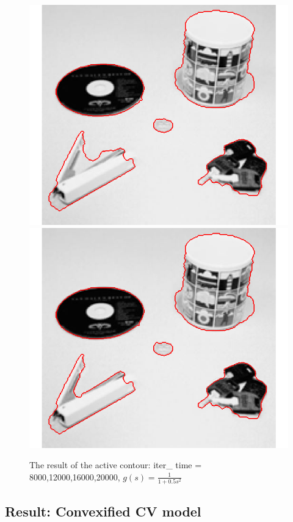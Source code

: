 \documentclass{article}
\begin{document}
\begin{figure}[H]
\begin{center}
\includegraphics[scale=.47]{ac_2.png}
\includegraphics[scale=.47]{ac_3.png}
\end{center}
\caption{The result of the active contour: iter\_ time = 8000,12000,16000,20000, $g(s) =\frac{1}{1+0.5s^2}$}
\end{figure}

\subsection{Result: Convexified CV model}
\end{document}
